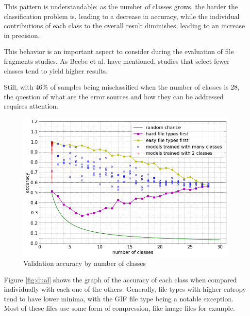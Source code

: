 This pattern is understandable: as the number of classes grows, the harder the classification problem is, leading to a decrease in accuracy, while the individual contributions of each class to the overall result diminishes, leading to an increase in precision.

This behavior is an important aspect to consider during the evaluation of file fragments studies. As Beebe et al. \cite{beebe_sceadan:_2013} have mentioned, studies that select fewer classes tend to yield higher results. 

Still, with 46\%  of samples being misclassified when the number of classes is 28, the question of what are the error sources and how they can be addressed requires attention.

\noindent
\begin{figure}[htb!]
\centering\includegraphics[width=1.0\textwidth]{content/nclasses.png}
\caption{\label{fig:nclasses}Validation accuracy by number of classes}%
\end{figure}

Figure \ref{fig:dual} shows the graph of the accuracy of each class when compared individually with each one of the others. Generally, file types with higher entropy tend to have lower minima, with the GIF  file type being a notable exception. Most of these files use some form of compression, like image files for example. 


